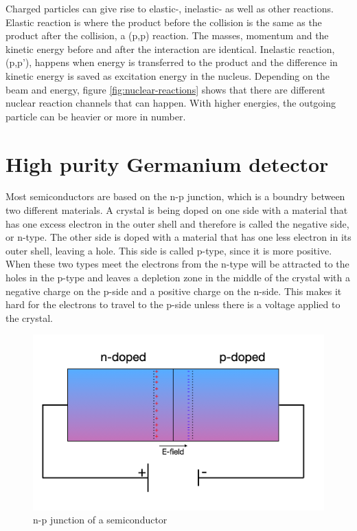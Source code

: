 \documentclass[twoside,english]{uiofysmaster/uiofysmaster}
\begin{document}
Charged particles can give rise to elastic-, inelastic- as well as other reactions. Elastic reaction is where the product before the collision is the same as the product after the collision, a (p,p) reaction. The masses, momentum and the kinetic energy before and after the interaction are identical\cite{Nuclear_medicine}.
Inelastic reaction, (p,p'), happens when energy is transferred to the product and the difference in kinetic energy is saved as excitation energy in the nucleus.
\noindent
Depending on the beam and energy, figure \ref{fig:nuclear-reactions} shows that there are different nuclear reaction channels that can happen. With higher energies, the outgoing particle can be heavier or more in number. 


\section{High purity Germanium detector}
\label{sec:ge-detector}

Most semiconductors are based on the n-p junction, which is a boundry between two different materials. A crystal is being doped on one side with a material that has one excess electron in the outer shell and therefore is called the negative side, or n-type. The other side is doped with a material that has one less electron in its outer shell, leaving a hole. This side is called p-type, since it is more positive. When these two types meet the electrons from the n-type will be attracted to the holes in the p-type and leaves a depletion zone in the middle of the crystal with a negative charge on the p-side and a positive charge on the n-side. This makes it hard for the electrons to travel to the p-side unless there is a voltage applied to the crystal. 
\begin{figure}[h!]
    \centering
     \includegraphics[scale=0.3]{semiconductor.png}
     \caption{n-p junction of a semiconductor} 
    \label{fig:n-p_junction}
\end{figure}
\noindent
\end{document}
